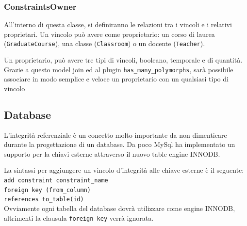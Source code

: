 \documentclass[11pt,a4paper]{article}
\begin{document}
\subsubsection{ConstraintsOwner}
All'interno di questa classe, si definiranno le relazioni tra i vincoli e i relativi proprietari.
Un vincolo può avere come proprietario: un corso di laurea (\verb|GraduateCourse|), una classe (\verb|Classroom|) o un docente (\verb|Teacher|).

Un proprietario, può avere tre tipi di vincoli, booleano, temporale e di quantità.
Grazie a questo model join ed al plugin \verb|has_many_polymorphs|, sarà possibile associare in modo semplice e veloce un proprietario con un qualsiasi tipo di vincolo
\subsection{Database}
L'integrità referenziale è un concetto molto importante da non dimenticare durante la progettazione di un database.
Da poco MySql ha implementato un supporto per la chiavi esterne attraverso il nuovo table engine INNODB.

La sintassi per aggiungere un vincolo d'integrità alle chiave esterne è il seguente:\\
\verb|add constraint constraint_name| \\
\verb|foreign key (from_column)|\\
\verb|references to_table(id)|\\
Ovviamente ogni tabella del database dovrà utilizzare come engine INNODB, altrimenti la clausula \verb|foreign key| verrà ignorata.
\end{document}
